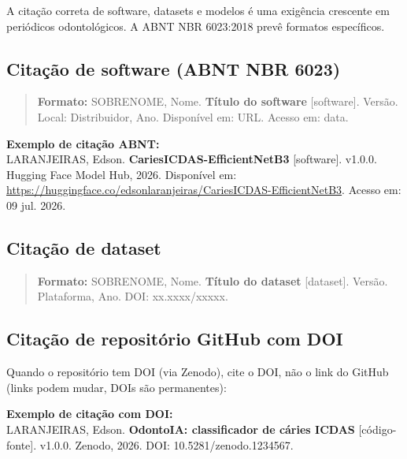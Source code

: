 A citação correta de software, datasets e modelos é uma exigência
crescente em periódicos odontológicos. A ABNT NBR 6023:2018 prevê
formatos específicos.

\subsection{Citação de software (ABNT NBR 6023)}

\begin{quote}
  \textbf{Formato:} SOBRENOME, Nome. \textbf{Título do software}
  [software]. Versão. Local: Distribuidor, Ano. Disponível em: URL.
  Acesso em: data.
\end{quote}

\begin{mdframed}[linecolor=corSecundaria, linewidth=1pt, backgroundcolor=corSecundaria!5, roundcorner=4pt]
  \textbf{Exemplo de citação ABNT:} \\
  LARANJEIRAS, Edson. \textbf{CariesICDAS-EfficientNetB3} [software].
  v1.0.0. Hugging Face Model Hub, 2026. Disponível em:
  \url{https://huggingface.co/edsonlaranjeiras/CariesICDAS-EfficientNetB3}.
  Acesso em: 09 jul. 2026.
\end{mdframed}

\subsection{Citação de dataset}

\begin{quote}
  \textbf{Formato:} SOBRENOME, Nome. \textbf{Título do dataset} [dataset].
  Versão. Plataforma, Ano. DOI: xx.xxxx/xxxxx.
\end{quote}

\subsection{Citação de repositório GitHub com DOI}

Quando o repositório tem DOI (via Zenodo), cite o DOI, não o link do
GitHub (links podem mudar, DOIs são permanentes):

\begin{mdframed}[linecolor=corSecundaria, linewidth=1pt, backgroundcolor=corSecundaria!5, roundcorner=4pt]
  \textbf{Exemplo de citação com DOI:} \\
  LARANJEIRAS, Edson. \textbf{OdontoIA: classificador de cáries ICDAS}
  [código-fonte]. v1.0.0. Zenodo, 2026. DOI: 10.5281/zenodo.1234567.
\end{mdframed}

